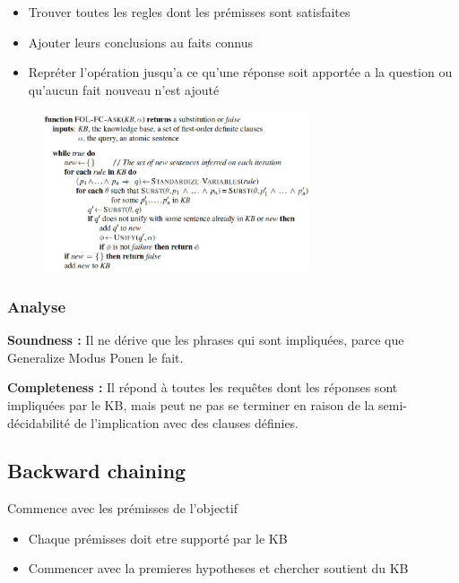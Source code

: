 		\begin{itemize}
			\item Trouver toutes les regles dont les prémisses sont satisfaites
			\item Ajouter leurs conclusions au faits connus
			\item Repréter l'opération jusqu'a ce qu'une réponse soit apportée a la question  ou qu'aucun fait nouveau n'est ajouté
			
		\end{itemize}	
		
		\begin{figure}[htp]	
			\centering
			\includegraphics[width=0.7\textwidth]{img/ForwardChaining.png}
		\end{figure}		
		
		\subsubsection{Analyse}
			\textbf{Soundness :} Il ne dérive que les phrases qui sont impliquées, parce que Generalize Modus Ponen le fait.
			
			\textbf{Completeness :} Il répond à toutes les requêtes dont les réponses sont impliquées par le KB, mais peut ne pas se terminer en raison de la semi-décidabilité de l'implication avec des clauses définies.
			
	\subsection{Backward chaining}
		Commence  avec les prémisses de l'objectif
		\begin{itemize}
			\item Chaque prémisses doit etre supporté par le KB
			\item Commencer avec la premieres hypotheses et chercher soutient du KB
			
		\end{itemize}
		
